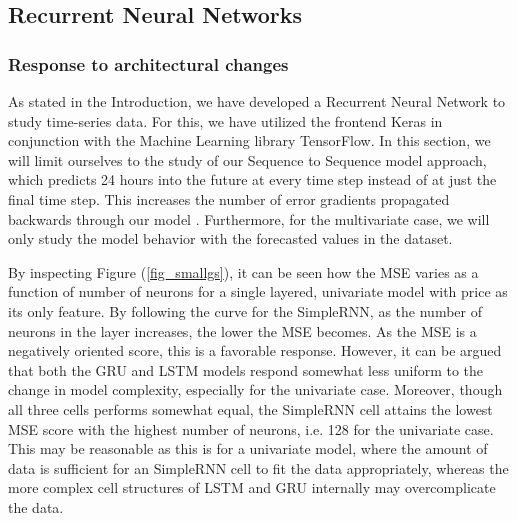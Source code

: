\documentclass
[twocolumn,
secnumarabic,
nobibnotes,
aps,
prl,
reprint,
groupedaddress,
amsmath,
amssymb,
]{revtex4-2}
\begin{document}
\subsection{Recurrent Neural Networks}

\subsubsection{Response to architectural changes}
As stated in the Introduction, we have developed a Recurrent Neural Network to study time-series data. For this, we have utilized the frontend Keras in conjunction with the Machine Learning library TensorFlow. In this section, we will limit ourselves to the study of our Sequence to Sequence model approach, which predicts 24 hours into the future at every time step instead of at just the final time step. This increases the number of error gradients propagated backwards through our model \cite{Geron2019}. Furthermore, for the multivariate case, we will only study the model behavior with the forecasted values in the dataset. 

By inspecting Figure (\ref{fig_smallgs}), it can be seen how the MSE varies as a function of number of neurons for a single layered, univariate model with price as its only feature. By following the curve for the SimpleRNN, as the number of neurons in the layer increases, the lower the MSE becomes. As the MSE is a negatively oriented score, this is a favorable response. However, it can be argued that both the GRU and LSTM models respond somewhat less uniform to the change in model complexity, especially for the univariate case. Moreover, though all three cells performs somewhat equal, the SimpleRNN cell attains the lowest MSE score with the highest number of neurons, i.e. 128 for the univariate case. This may be reasonable as this is for a univariate model, where the amount of data is sufficient for an SimpleRNN cell to fit the data appropriately, whereas the more complex cell structures of LSTM and GRU internally may overcomplicate the data. 
\end{document}

